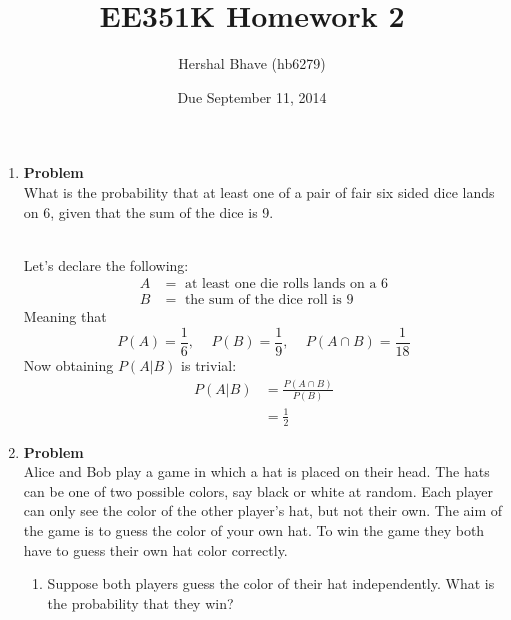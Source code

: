 \documentclass[12pt]{article}
\title{EE351K Homework 2}
\author{Hershal Bhave (hb6279)}
\date{Due September 11, 2014}
\newenvironment{Ex}{\textbf{Problem}\vspace{.75em}\\}{}
\begin{document}
\maketitle
\begin{enumerate}
\item
  \begin{Ex}
    What is the probability that at least one of a pair of fair six
    sided dice lands on 6, given that the sum of the dice is 9.
    \begin{solution}
      \hfill \vspace{0.75em} \\
      Let's declare the following:
      \begin{equation}
        \label{eq:1-var-declaration}
        \begin{aligned}
          A &= \text{ at least one die rolls lands on a }6 \\
          B &= \text{ the sum of the dice roll is }9
        \end{aligned}
      \end{equation}
      Meaning that
      \begin{equation}
        \label{eq:1-prob-declaration}
        P(A) = \frac{1}{6} \text{, } \quad
        P(B) = \frac{1}{9} \text{, } \quad
        P(A \cap B) = \frac{1}{18}
      \end{equation}
      Now obtaining $P(A | B)$ is trivial:
      \begin{equation}
        \label{eq:1-answer}
        \begin{aligned}
          P(A | B) &= \frac{P(A \cap B)}{P(B)} \\
          &= \frac{1}{2}
        \end{aligned}
      \end{equation}
    \end{solution}
  \end{Ex}
\item
  \begin{Ex}
    Alice and Bob play a game in which a hat is placed on their
    head. The hats can be one of two possible colors, say black or
    white at random. Each player can only see the color of the other
    player's hat, but not their own. The aim of the game is to guess
    the color of your own hat. To win the game they both have to guess
    their own hat color correctly.
    \begin{enumerate}
    \item Suppose both players guess the color of their hat
      independently. What is the probability that they win?

\end{enumerate}
\end{Ex}
\end{enumerate}
\end{document}
